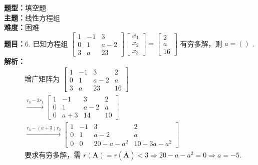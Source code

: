 \documentclass{ctexart}
\newenvironment{question}[5]{%
	\noindent\textbf{题型：}#1\\
	\textbf{主题：}#2\\
	\textbf{难度：}#3\\
	\textbf{题目：}#4\\
	\textbf{解析：}#5\\
	\vspace{1em}
}{}
\begin{document}
	\begin{question}
		{填空题}
		{线性方程组}
		{困难}
		{6. 已知方程组 \(\left[\begin{array}{ccc}1 & -1 & 3 \\ 0 & 1 & a-2 \\ 3 & a & 23\end{array}\right] \left[\begin{array}{l}x_1 \\ x_2 \\ x_3\end{array}\right] = \left[\begin{array}{c}2 \\ a \\ 16\end{array}\right]\) 有穷多解，则 \(a=()\) . }
		{\[
			\begin{aligned}
				& \text{增广矩阵为 } \left[\begin{array}{ccc|c}1 & -1 & 3 & 2 \\ 0 & 1 & a-2 & a \\ 3 & a & 23 & 16\end{array}\right] \\
				& \xrightarrow{r_3 - 3r_1} \left[\begin{array}{ccc|c}1 & -1 & 3 & 2 \\ 0 & 1 & a-2 & a \\ 0 & a+3 & 14 & 10\end{array}\right] \\
				& \xrightarrow{r_3 - (a+3)r_2} \left[\begin{array}{ccc|c}1 & -1 & 3 & 2 \\ 0 & 1 & a-2 & a \\ 0 & 0 & 20 - a - a^2 & 10 - 3a - a^2\end{array}\right] \\
				& \text{要求有穷多解，需 } r(\mathbf{A}) = r(\overline{\mathbf{A}}) < 3 \Rightarrow 20 - a - a^2 = 0 \Rightarrow a = -5. 
			\end{aligned}
			\]}
	\end{question}
	
\end{document}
